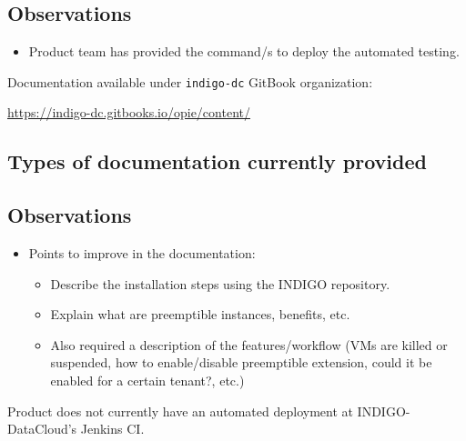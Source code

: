 \documentclass[a4wide,11pt]{article}
\begin{document}
\subsection{Observations}
\begin{itemize}
        \item Product team has provided the command/s to deploy the automated testing.
    \end{itemize}



\label{sec:gitbook}
Documentation available under \texttt{indigo-dc} GitBook organization: \vspace{0.1em} \begin{center}\url{https://indigo-dc.gitbooks.io/opie/content/}\end{center} 
\subsection{Types of documentation currently provided}
\begin{center}
\end{center}
\subsection{Observations}
\begin{itemize}
        \item Points to improve in the documentation: \begin{itemize} \item Describe the installation steps using the INDIGO repository. \item Explain what are preemptible instances, benefits, etc. \item Also required a description of the features/workflow (VMs are killed or suspended, how to enable/disable preemptible extension, could it be enabled for a certain tenant?, etc.) \end{itemize}
    \end{itemize}



\label{sec:configuration}


Product does not currently have an automated deployment at INDIGO-DataCloud's Jenkins CI.
\end{document}
